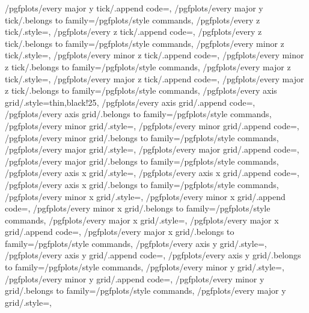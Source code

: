 {	/pgfplots/every major y tick/.append code={},
	/pgfplots/every major y tick/.belongs to family=/pgfplots/style commands,
	/pgfplots/every z tick/.style={},
	/pgfplots/every z tick/.append code={},
	/pgfplots/every z tick/.belongs to family=/pgfplots/style commands,
	/pgfplots/every minor z tick/.style={},
	/pgfplots/every minor z tick/.append code={},
	/pgfplots/every minor z tick/.belongs to family=/pgfplots/style commands,
	/pgfplots/every major z tick/.style={},
	/pgfplots/every major z tick/.append code={},
	/pgfplots/every major z tick/.belongs to family=/pgfplots/style commands,
	/pgfplots/every axis grid/.style={thin,black!25},
	/pgfplots/every axis grid/.append code={},
	/pgfplots/every axis grid/.belongs to family=/pgfplots/style commands,
	/pgfplots/every minor grid/.style={},
	/pgfplots/every minor grid/.append code={},
	/pgfplots/every minor grid/.belongs to family=/pgfplots/style commands,
	/pgfplots/every major grid/.style={},
	/pgfplots/every major grid/.append code={},
	/pgfplots/every major grid/.belongs to family=/pgfplots/style commands,
	/pgfplots/every axis x grid/.style={},
	/pgfplots/every axis x grid/.append code={},
	/pgfplots/every axis x grid/.belongs to family=/pgfplots/style commands,
	/pgfplots/every minor x grid/.style={},
	/pgfplots/every minor x grid/.append code={},
	/pgfplots/every minor x grid/.belongs to family=/pgfplots/style commands,
	/pgfplots/every major x grid/.style={},
	/pgfplots/every major x grid/.append code={},
	/pgfplots/every major x grid/.belongs to family=/pgfplots/style commands,
	/pgfplots/every axis y grid/.style={},
	/pgfplots/every axis y grid/.append code={},
	/pgfplots/every axis y grid/.belongs to family=/pgfplots/style commands,
	/pgfplots/every minor y grid/.style={},
	/pgfplots/every minor y grid/.append code={},
	/pgfplots/every minor y grid/.belongs to family=/pgfplots/style commands,
	/pgfplots/every major y grid/.style={},
}
